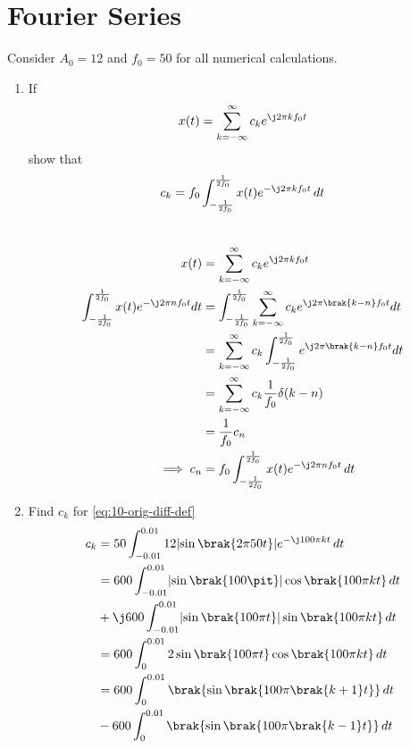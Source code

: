 \documentclass[journal,12pt,twocolumn]{IEEEtran}
\DeclarePairedDelimiter\abs{\lvert}{\rvert}%
\renewcommand\thesection{\arabic{section}}
\begin{document}
\section{Fourier Series}
Consider $A_0 =12$ and $f_0 = 50$ for all numerical calculations.
\begin{enumerate}[label=\thesection.\arabic*,ref=\thesection.\theenumi]
\item If
\begin{align}
	x(t) = \sum_{k = -\infty}^{\infty}c_ke^{\j2\pi kf_0 t}
\label{eq:one-Z-complex}
\end{align}
show that 
\begin{align}
	c_k = f_0\int_{-\frac{1}{2f_0}}^{\frac{1}{2f_0}}x(t)e^{-\j2\pi kf_0 t}\, dt
\label{eq:one-Z}
\end{align}
\\\solution \begin{align}
    	x(t) &= \sum_{k = -\infty}^{\infty}c_ke^{\j2\pi kf_0 t}\\
    	\int_{-\frac{1}{2f_0}}^{\frac{1}{2f_0}}x(t)e^{-\j2\pi nf_0 t}dt &= \int_{-\frac{1}{2f_0}}^{\frac{1}{2f_0}}\sum_{k = -\infty}^{\infty}c_ke^{\j2\pi \brak{k-n}f_0 t}dt\\
    	&= \sum_{k = -\infty}^{\infty}c_k\int_{-\frac{1}{2f_0}}^{\frac{1}{2f_0}}e^{\j2\pi \brak{k-n}f_0 t}dt\\
    	&= \sum_{k = -\infty}^{\infty}c_k \frac{1}{f_0}\delta(k-n)\\
    	&= \frac{1}{f_0}c_n\\
    	\implies c_n &= f_0\int_{-\frac{1}{2f_0}}^{\frac{1}{2f_0}}x(t)e^{-\j2\pi nf_0 t}\, dt
\end{align}
	\item Find $c_k$ for 
	\eqref{eq:10-orig-diff-def}\\\solution\begin{align}
	    c_k &= 50\int_{-0.01}^{0.01}12\abs{\sin\brak{2\pi 50t}}
    e^{-\j100\pi kt}\, dt \\
        &= 600\int_{-0.01}^{0.01}\abs{\sin\brak{100\pit}}
    \cos\brak{100\pi kt}\, dt \nonumber \\
        &+ \j 600\int_{-0.01}^{0.01}
        \abs{\sin\brak{100\pi t}}\sin\brak{100\pi kt}\, dt \\
        &= 600\int_{0}^{0.01}2\sin\brak{100\pi t}\cos\brak{100\pi kt}\, dt \\
        &= 600\int_{0}^{0.01}\brak{\sin\brak{100\pi\brak{k+1}t}}\, dt \nonumber \\ 
        &- 600\int_{0}^{0.01}\brak{\sin\brak{100\pi\brak{k-1}t}}\, dt \\ 

\end{align}
\end{enumerate}
\end{document}

